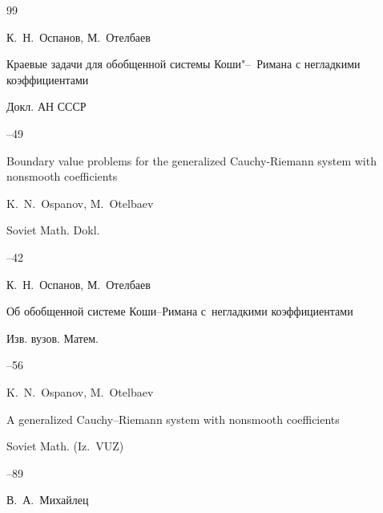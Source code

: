 \begin{thebibliography}{99}

\by К.~Н.~Оспанов, М.~Отелбаев

\paper Краевые задачи для обобщенной системы Коши"--~Римана с негладкими коэффициентами

\jour Докл. АН СССР




--49

\transl

\paper Boundary value problems for the generalized Cauchy-Riemann system with nonsmooth coefficients

\by K.~N.~Ospanov, M.~Otelbaev

\jour Soviet Math. Dokl.




--42

 




\by К.~Н.~Оспанов, М.~Отелбаев

\paper Об обобщенной системе Коши--Римана с~негладкими коэффициентами

\jour Изв. вузов. Матем.



--56




\transl

\by K.~N.~Ospanov, M.~Otelbaev

\paper A generalized Cauchy--Riemann system with nonsmooth coefficients

\jour Soviet Math. (Iz.~VUZ)




--89








\by В.~А.~Михайлец


\end{thebibliography}
